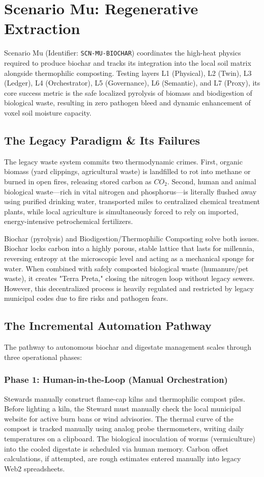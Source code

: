 \chapter{Scenario Mu: Regenerative Extraction}
\label{ch:scenario_mu}

Scenario Mu (Identifier: \texttt{SCN-MU-BIOCHAR}) coordinates the high-heat physics required to produce biochar and tracks its integration into the local soil matrix alongside thermophilic composting. Testing layers L1 (Physical), L2 (Twin), L3 (Ledger), L4 (Orchestrator), L5 (Governance), L6 (Semantic), and L7 (Proxy), its core success metric is the safe localized pyrolysis of biomass and biodigestion of biological waste, resulting in zero pathogen bleed and dynamic enhancement of voxel soil moisture capacity.

\section{The Legacy Paradigm \& Its Failures}
The legacy waste system commits two thermodynamic crimes. First, organic biomass (yard clippings, agricultural waste) is landfilled to rot into methane or burned in open fires, releasing stored carbon as $CO_2$. Second, human and animal biological waste---rich in vital nitrogen and phosphorus---is literally flushed away using purified drinking water, transported miles to centralized chemical treatment plants, while local agriculture is simultaneously forced to rely on imported, energy-intensive petrochemical fertilizers.

Biochar (pyrolysis) and Biodigestion/Thermophilic Composting solve both issues. Biochar locks carbon into a highly porous, stable lattice that lasts for millennia, reversing entropy at the microscopic level and acting as a mechanical sponge for water. When combined with safely composted biological waste (humanure/pet waste), it creates "Terra Preta," closing the nitrogen loop without legacy sewers. However, this decentralized process is heavily regulated and restricted by legacy municipal codes due to fire risks and pathogen fears.

\section{The Incremental Automation Pathway}
The pathway to autonomous biochar and digestate management scales through three operational phases:

\subsection{Phase 1: Human-in-the-Loop (Manual Orchestration)}
Stewards manually construct flame-cap kilns and thermophilic compost piles. Before lighting a kiln, the Steward must manually check the local municipal website for active burn bans or wind advisories. The thermal curve of the compost is tracked manually using analog probe thermometers, writing daily temperatures on a clipboard. The biological inoculation of worms (vermiculture) into the cooled digestate is scheduled via human memory. Carbon offset calculations, if attempted, are rough estimates entered manually into legacy Web2 spreadsheets.

